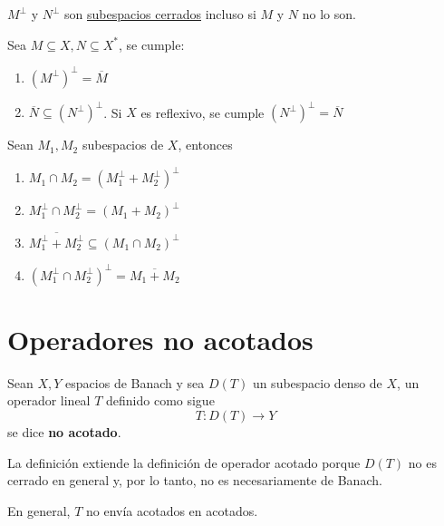 \documentclass[12pt]{book}
\begin{document}
\begin{observacion}
    $M^{\perp}$ y $N^{\perp}$ son \underline{subespacios cerrados} incluso si $M$ y $N$ no lo son.
\end{observacion}


\begin{prop}
    Sea $M\subseteq X, N \subseteq X^*$, se cumple:
    \begin{enumerate}
        \item[i)] $(M^{\perp})^{\perp} = \overline{M}$
        \item[ii)] $\overline{N} \subseteq (N^{\perp})^{\perp}$. Si $X$ es reflexivo, se cumple $(N^{\perp})^{\perp} = \overline{N}$
    \end{enumerate}
\end{prop}


\begin{prop}
    Sean $M_1, M_2$ subespacios de $X$, entonces
    \begin{enumerate}
        \item $M_1 \cap M_2 = (M_1^\perp + M_2^\perp)^\perp$
        \item $M_1^\perp \cap M_2^\perp = (M_1 + M_2)^\perp$
        \item $\overline{M_1^\perp + M_2^\perp} \subseteq (M_1 \cap M_2)^\perp$
        \item $(M_1^\perp \cap M_2^\perp)^\perp = \overline{M_1 + M_2}$
    \end{enumerate}
\end{prop}


\section{Operadores no acotados}

\begin{definicion}
    Sean $X,Y$ espacios de Banach y sea $D(T)$ un subespacio denso de $X$, un operador lineal $T$ definido como sigue
    \begin{equation*}
        T: D(T) \to Y
    \end{equation*}
    se dice \textbf{no acotado}.
\end{definicion}

\begin{observacion}
    La definición extiende la definición de operador acotado porque $D(T)$ no es cerrado en general y, por lo tanto, no es necesariamente de Banach. 
\end{observacion}


\begin{observacion}
    En general, $T$ no envía acotados en acotados.
\end{observacion}
\end{document}
